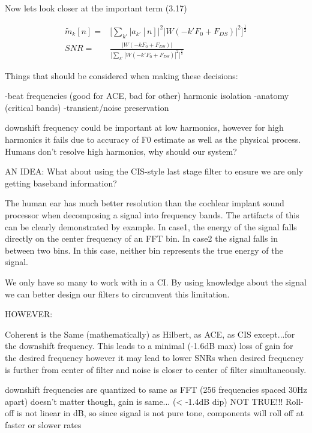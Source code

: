 \documentclass [11pt, proquest] {uwthesis}[2015/03/03]
\begin{document}
Now lets look closer at the important term (3.17)

\begin{align}
\tilde{m}_k[n] =& \Bigg[ \sum_{k'} | a_{k'}[n]|^2 |W(-k'F_0 + F_{DS})|^2 \Bigg]^\frac{1}{2} \\
SNR =& \frac{|W(-kF_0 + F_{DS})|}{\Big[ \sum_{k'} |W(-k'F_0 + F_{DS})|^2 \Big]^\frac{1}{2}}
\end{align}







Things that should be considered when making these decisions:

-beat frequencies (good for ACE, bad for other)
    harmonic isolation
-anatomy (critical bands)
-transient/noise preservation

downshift frequency could be important at low harmonics, however for high harmonics it fails due to accuracy of F0 estimate as well as the physical process.  Humans don't resolve high harmonics, why should our system?


AN IDEA:
What about using the CIS-style last stage filter to ensure we are only getting baseband information?




The human ear has much better resolution than the cochlear implant sound processor when decomposing a signal into frequency bands.  The artifacts of this can be clearly demonstrated by example.  In case1, the energy of the signal falls directly on the center frequency of an FFT bin.  In case2 the signal falls in between two bins.  In this case, neither bin represents the true energy of the signal.

We only have so many to work with in a CI.  By using knowledge about the signal we can better design our filters to circumvent this limitation.

HOWEVER:

Coherent is the Same (mathematically) as Hilbert, as ACE, as CIS except...for the downshift frequency.  This leads to a minimal (-1.6dB max) loss of gain for the desired frequency however it may lead to lower SNRs when desired frequency is further from center of filter and noise is closer to center of filter simultaneously.

downshift frequencies are quantized to same as FFT (256 frequencies spaced 30Hz apart)
doesn't matter though, gain is same... (< -1.4dB dip)
NOT TRUE!!! Roll-off is not linear in dB, so since signal is not pure tone, components will roll off at faster or slower rates
\end{document}
